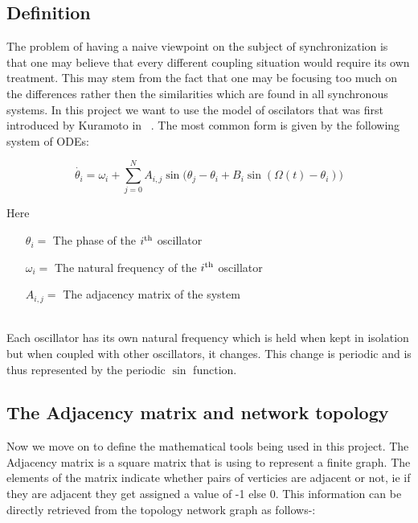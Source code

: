 \label{sec:kuramoto}

\subsection{Definition}
The problem of having a naive viewpoint on the subject of synchronization is that one may believe that every different coupling situation would require its own treatment. This may stem from the fact that one may be focusing too much on the differences rather then the similarities which are found in all synchronous systems.  In this project we want to use the model of oscilators that was first introduced by Kuramoto in ~\cite{book:kura}. The most common form is given by the following system of ODEs:

\[
\dot{\theta_i} = \omega_i + \sum_{j = 0}^{N}{A_{i, j}\sin({\theta_j - \theta_i}} + B_i \sin(\Omega(t) - \theta_i)
)\]

Here 
\begin{itemize}
	\item[${\theta_i} = $] The phase of the $i\textsuperscript{th}$ oscillator
	\item[$\omega_i = $] The natural frequency of the $i\textsuperscript{th}$ oscillator
	\item[$A_{i, j} = $] The adjacency matrix of the system
\end{itemize}
~\\
Each oscillator has its own natural frequency which is held when kept in isolation but when coupled with other oscillators, it changes. This change is periodic and is thus represented by the periodic $\sin$ function.

\subsection{The Adjacency matrix and network topology}


Now we move on to define the mathematical tools being used in this project. The Adjacency matrix is a square matrix that is using to represent a finite graph. The elements of the matrix indicate whether pairs of verticies are adjacent or not, ie if they are adjacent they get assigned a value of -1 else 0. This information can be directly retrieved from the topology network graph as follows-:

